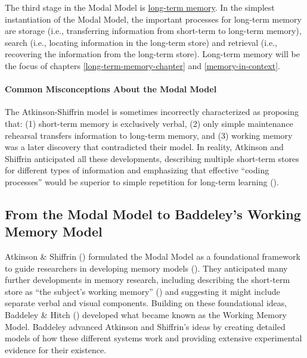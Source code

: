 \documentclass[
]{krantz}
\begin{document}
The third stage in the Modal Model is \hyperref[long-term-memory]{long-term memory}. In the simplest instantiation of the Modal Model, the important processes for long-term memory are storage (i.e., transferring information from short-term to long-term memory), search (i.e., locating information in the long-term store) and retrieval (i.e., recovering the information from the long-term store). Long-term memory will be the focus of chapters \ref{long-term-memory-chapter} and \ref{memory-in-context}.

\paragraph*{Common Misconceptions About the Modal Model}\label{common-misconceptions-about-the-modal-model}

The Atkinson-Shiffrin model is sometimes incorrectly characterized as proposing that: (1) short-term memory is exclusively verbal, (2) only simple maintenance rehearsal transfers information to long-term memory, and (3) working memory was a later discovery that contradicted their model. In reality, Atkinson and Shiffrin anticipated all these developments, describing multiple short-term stores for different types of information and emphasizing that effective ``coding processes'' would be superior to simple repetition for long-term learning ().

\subsection*{From the Modal Model to Baddeley's Working Memory Model}\label{from-the-modal-model-to-baddeleys-working-memory-model}


Atkinson \& Shiffrin () formulated the Modal Model as a foundational framework to guide researchers in developing memory models (). They anticipated many further developments in memory research, including describing the short-term store as ``the subject's working memory'' () and suggesting it might include separate verbal and visual components. Building on these foundational ideas, Baddeley \& Hitch () developed what became known as the Working Memory Model. Baddeley advanced Atkinson and Shiffrin's ideas by creating detailed models of how these different systems work and providing extensive experimental evidence for their existence.
\end{document}
